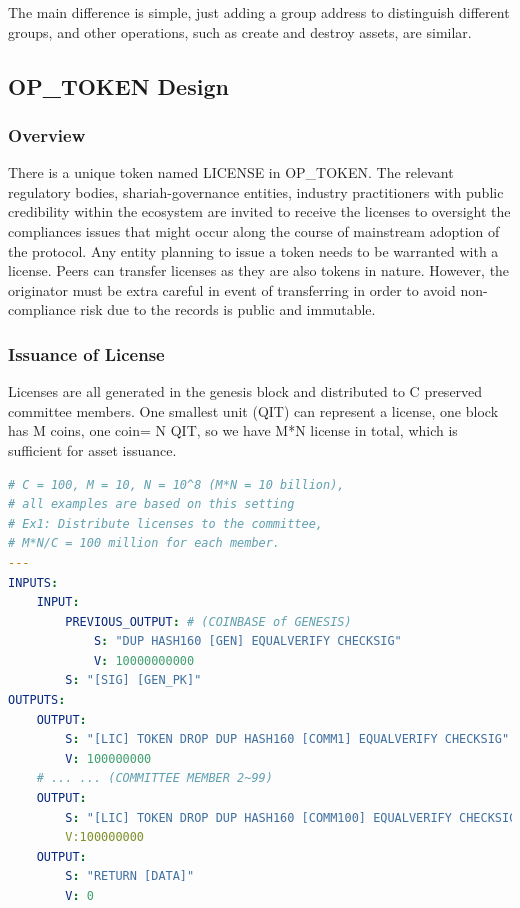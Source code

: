 \documentclass[a4paper,11pt]{article}
\begin{document}
The main difference is simple, just adding a group address to distinguish different groups, and other operations, such as create and destroy assets, are similar.


\subsection{OP\_TOKEN Design}

\subsubsection{Overview}

There is a unique token named LICENSE in OP\_TOKEN. The relevant regulatory bodies, shariah-governance entities, industry practitioners with public credibility within the ecosystem are invited to receive the licenses to oversight the compliances issues that might occur along the course of mainstream adoption of the protocol. Any entity planning to issue a token needs to be warranted with a license. Peers can transfer licenses as they are also tokens in nature. However, the originator must be extra careful in event of transferring in order to avoid non-compliance risk due to the records is public and immutable.  
 

\subsubsection{Issuance of License}

Licenses are all generated in the genesis block and distributed to C preserved committee members. One smallest unit (QIT) can represent a license, one block has M coins, one coin= N QIT, so we have M*N license in total, which is sufficient for asset issuance.


\begin{lstlisting}[language=yaml, numbers=none,basicstyle=\footnotesize]
# C = 100, M = 10, N = 10^8 (M*N = 10 billion),
# all examples are based on this setting
# Ex1: Distribute licenses to the committee,
# M*N/C = 100 million for each member.
---
INPUTS:
	INPUT:
		PREVIOUS_OUTPUT: # (COINBASE of GENESIS)
			S: "DUP HASH160 [GEN] EQUALVERIFY CHECKSIG"
			V: 10000000000
		S: "[SIG] [GEN_PK]"
OUTPUTS:
	OUTPUT:
		S: "[LIC] TOKEN DROP DUP HASH160 [COMM1] EQUALVERIFY CHECKSIG"
		V: 100000000
	# ... ... (COMMITTEE MEMBER 2~99)
	OUTPUT:
		S: "[LIC] TOKEN DROP DUP HASH160 [COMM100] EQUALVERIFY CHECKSIG"
		V:100000000
	OUTPUT:
		S: "RETURN [DATA]"
		V: 0
\end{lstlisting}
\end{document}
